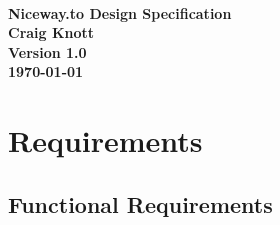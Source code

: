 \documentclass[a4paper,twoside,notitlepage,11pt]{article}
\newcommand{\paperTitle}{Niceway.to Design Specification}
\begin{document}
\begin{center}
 \ \\[4cm]
 {\LARGE \textbf{\paperTitle} \\ [0.2cm]}
   \textbf{Craig Knott} \\
    \textbf{Version 1.0}\\
	 \textbf{\today}
\end{center}

 \tableofcontents
  \newpage
   \pagestyle{plain}
 
 \section{Requirements}
 \subsection{Functional Requirements}
\end{document}
